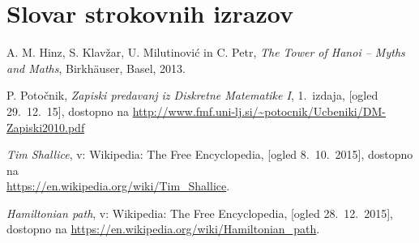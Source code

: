 \documentclass[12pt,a4paper]{amsart}
\theoremstyle{definition} %
\theoremstyle{plain} %
\newcommand{\geslo}[2]{\noindent\textbf{#1}\hspace*{3mm}\hangindent=\parindent\hangafter=1 #2}
\begin{document}
\section*{Slovar strokovnih izrazov}

%
%

\begin{thebibliography}{99}

 A. M. Hinz, S. Klavžar, U. Milutinović in C. Petr, \emph{The Tower of Hanoi – Myths and Maths}, Birkhäuser, Basel, 2013.

 P. Potočnik, \emph{Zapiski predavanj iz Diskretne Matematike I}, 1.~izdaja, [ogled 29.~12.~15], dostopno na \url{http://www.fmf.uni-lj.si/~potocnik/Ucbeniki/DM-Zapiski2010.pdf}

 \emph{Tim Shallice}, v: Wikipedia: The Free Encyclopedia, [ogled 8.~10.~2015], dostopno na\\ \url{https://en.wikipedia.org/wiki/Tim_Shallice}.

 \emph{Hamiltonian path}, v: Wikipedia: The Free Encyclopedia, [ogled 28.~12.~2015], dostopno na \url{https://en.wikipedia.org/wiki/Hamiltonian_path}.
\end{thebibliography}
\end{document}
